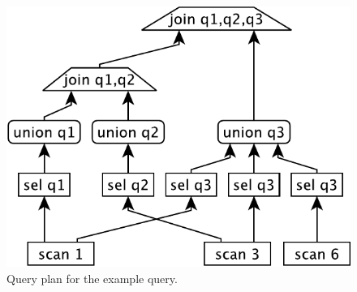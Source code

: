 %  	


\begin{figure}[htb]
  \centering
  \includegraphics[width=0.6\linewidth]{figs/plan-crop.pdf}
  \caption{Query plan for the example query.}
\label{fig:plan}
\end{figure}

